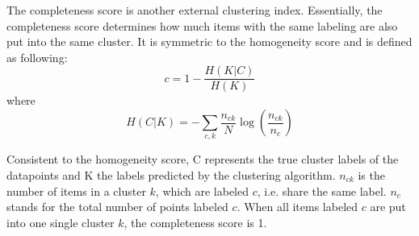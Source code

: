 The completeness score is another external clustering index. Essentially, the completeness score determines how much items with the same labeling are also put into the same cluster. It is symmetric to the homogeneity score and is defined as following: \cite{rosenberg2007v}
$$c = 1 - \frac{H(K|C)}{H(K)}$$
where
$$H(C|K) = - \sum_{c,k} \frac{n_{ck}}{N}\log\left(\frac{n_{ck}}{n_c}\right)$$

Consistent to the homogeneity score, C represents the true cluster labels of the datapoints and K the labels predicted by the clustering algorithm. $n_{ck}$ is the number of items in a cluster $k$, which are labeled $c$, i.e. share the same label. $n_c$ stands for the total number of points labeled $c$.
When all items labeled $c$ are put into one single cluster $k$, the completeness score is 1.